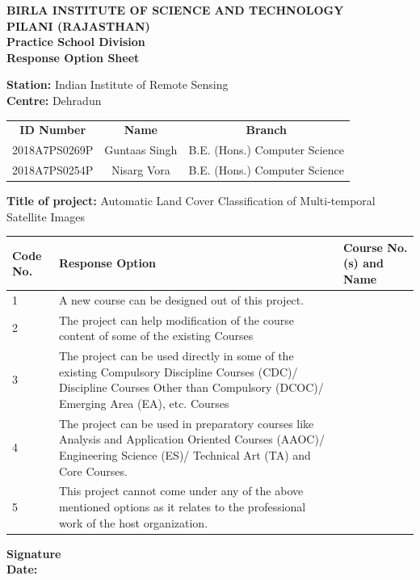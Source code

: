 \documentclass[12pt, a4paper]{report}
\begin{document}
\begin{center}  
\textbf {BIRLA INSTITUTE OF SCIENCE AND TECHNOLOGY\\
PILANI (RAJASTHAN)\\
Practice School Division\\
Response Option Sheet}
\end{center}
\begin{onehalfspace}
\textbf{Station:} Indian Institute of Remote Sensing \\
\textbf{Centre:} Dehradun
\begin{center}
\begin{tabular}{c c c}
\textbf{ID Number} & \textbf{Name} & \textbf{Branch} \\
2018A7PS0269P & Guntaas Singh & B.E. (Hons.) Computer Science \\
2018A7PS0254P & Nisarg Vora  & B.E. (Hons.) Computer Science \\
\end{tabular} 
\end{center}
\textbf{Title of project:} Automatic Land Cover Classification of Multi-temporal Satellite Images\\
\begin{center}
\begin{tabular}{|p{1cm}|p{10cm}|p{3cm}|}
\hline
\textbf{Code No.} & \textbf{Response Option} & \textbf{Course No.(s) and Name} \\
\hline
1 & A new course can be designed out of this project. & ~\\
\hline
2 & The project can help modification of the course content of some of the existing Courses & ~\\
\hline
3 & The project can be used directly in some of the existing Compulsory Discipline Courses (CDC)/ Discipline Courses Other than Compulsory (DCOC)/ Emerging Area (EA), etc. Courses & ~\\
\hline
4 & The project can be used in preparatory courses like Analysis and Application Oriented Courses (AAOC)/ Engineering Science (ES)/ Technical Art (TA) and Core Courses. & ~\\
\hline
5 & This project cannot come under any of the above mentioned options as it relates to the professional work of the host organization. &~ \\
\hline
\end{tabular} 
\end{center}
\end{onehalfspace}
\vspace*{0.5cm}
\textbf{Signature}\\
\textbf{Date: }
\newpage
\end{document}
